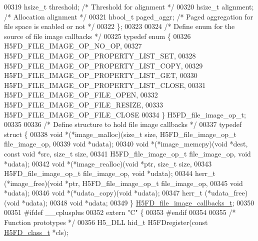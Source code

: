 \begin{DoxyCode}
00319     hsize\_t             threshold;      \textcolor{comment}{/* Threshold for alignment  */}
00320     hsize\_t             alignment;      \textcolor{comment}{/* Allocation alignment     */}
00321     hbool\_t             paged\_aggr;     \textcolor{comment}{/* Paged aggregation for file space is enabled or not */}
00322 \};
00323 
00324 \textcolor{comment}{/* Define enum for the source of file image callbacks */}
00325 \textcolor{keyword}{typedef} \textcolor{keyword}{enum} \{
00326     H5FD\_FILE\_IMAGE\_OP\_NO\_OP,
00327     H5FD\_FILE\_IMAGE\_OP\_PROPERTY\_LIST\_SET,     
00328     H5FD\_FILE\_IMAGE\_OP\_PROPERTY\_LIST\_COPY,
00329     H5FD\_FILE\_IMAGE\_OP\_PROPERTY\_LIST\_GET,
00330     H5FD\_FILE\_IMAGE\_OP\_PROPERTY\_LIST\_CLOSE,
00331     H5FD\_FILE\_IMAGE\_OP\_FILE\_OPEN,
00332     H5FD\_FILE\_IMAGE\_OP\_FILE\_RESIZE,
00333     H5FD\_FILE\_IMAGE\_OP\_FILE\_CLOSE
00334 \} H5FD\_file\_image\_op\_t;
00335 
00336 \textcolor{comment}{/* Define structure to hold file image callbacks */}
00337 \textcolor{keyword}{typedef} \textcolor{keyword}{struct }\{
00338     \textcolor{keywordtype}{void}   *(*image\_malloc)(\textcolor{keywordtype}{size\_t} size, H5FD\_file\_image\_op\_t file\_image\_op, 
00339                             \textcolor{keywordtype}{void} *udata);
00340     \textcolor{keywordtype}{void}   *(*image\_memcpy)(\textcolor{keywordtype}{void} *dest, \textcolor{keyword}{const} \textcolor{keywordtype}{void} *src, \textcolor{keywordtype}{size\_t} size,
00341                             H5FD\_file\_image\_op\_t file\_image\_op, \textcolor{keywordtype}{void} *udata);
00342     \textcolor{keywordtype}{void}   *(*image\_realloc)(\textcolor{keywordtype}{void} *ptr, \textcolor{keywordtype}{size\_t} size, 
00343                             H5FD\_file\_image\_op\_t file\_image\_op, \textcolor{keywordtype}{void} *udata);
00344     herr\_t  (*image\_free)(\textcolor{keywordtype}{void} *ptr, H5FD\_file\_image\_op\_t file\_image\_op, 
00345                           \textcolor{keywordtype}{void} *udata);
00346     \textcolor{keywordtype}{void}   *(*udata\_copy)(\textcolor{keywordtype}{void} *udata);
00347     herr\_t  (*udata\_free)(\textcolor{keywordtype}{void} *udata);
00348     \textcolor{keywordtype}{void} *udata;
00349 \} \hyperlink{struct_h5_f_d__file__image__callbacks__t}{H5FD\_file\_image\_callbacks\_t};
00350 
00351 \textcolor{preprocessor}{#ifdef \_\_cplusplus}
00352 \textcolor{keyword}{extern} \textcolor{stringliteral}{"C"} \{
00353 \textcolor{preprocessor}{#endif}
00354 
00355 \textcolor{comment}{/* Function prototypes */}
00356 H5\_DLL hid\_t H5FDregister(\textcolor{keyword}{const} \hyperlink{struct_h5_f_d__class__t}{H5FD\_class\_t} *cls);

\end{DoxyCode}
